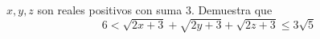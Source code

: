 $x, y, z$ son reales positivos con suma $3$. Demuestra que
\[ 6 < \sqrt{2x+3} + \sqrt{2y+3} + \sqrt{2z+3}\le 3\sqrt{5} \] 

